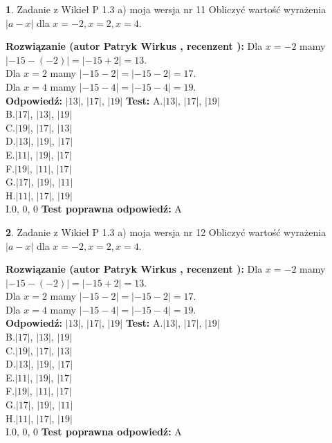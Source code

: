 \documentclass[12pt, a4paper]{article}
\theoremstyle{definition} %
\newtheorem{zad}{}
\newcommand{\zadStart}[1]{\begin{zad}#1\newline}
\newcommand{\zadStop}{\end{zad}}
\newcommand{\rozwStart}[2]{\noindent \textbf{Rozwiązanie (autor #1 , recenzent #2): }\newline}
\newcommand{\rozwStop}{\newline}
\newcommand{\odpStart}{\noindent \textbf{Odpowiedź:}\newline}
\newcommand{\odpStop}{\newline}
\newcommand{\testStart}{\noindent \textbf{Test:}\newline}
\newcommand{\testStop}{\newline}
\newcommand{\kluczStart}{\noindent \textbf{Test poprawna odpowiedź:}\newline}
\newcommand{\kluczStop}{\newline}
\begin{document}
\zadStart{Zadanie z Wikieł P 1.3 a) moja wersja nr 11}
Obliczyć wartość wyrażenia $|a - x|$ dla $x=-2,x=2,x=4$.
\zadStop
\rozwStart{Patryk Wirkus}{}
Dla $x = -2$ mamy $|-15 - (-2)| = |-15 + 2| = 13$.\\
Dla $x = 2$ mamy $|-15 - 2| = |-15 - 2| = 17$.\\
Dla $x = 4$ mamy $|-15 - 4| = |-15 - 4| = 19$.\\
\rozwStop
\odpStart
$|13|$, $|17|$, $|19|$
\odpStop
\testStart
A.$|13|$, $|17|$, $|19|$\\
B.$|17|$, $|13|$, $|19|$\\
C.$|19|$, $|17|$, $|13|$\\
D.$|13|$, $|19|$, $|17|$\\
E.$|11|$, $|19|$, $|17|$\\
F.$|19|$, $|11|$, $|17|$\\
G.$|17|$, $|19|$, $|11|$\\
H.$|11|$, $|17|$, $|19|$\\
I.$0$, $0$, $0$
\testStop
\kluczStart
A
\kluczStop



\zadStart{Zadanie z Wikieł P 1.3 a) moja wersja nr 12}
Obliczyć wartość wyrażenia $|a - x|$ dla $x=-2,x=2,x=4$.
\zadStop
\rozwStart{Patryk Wirkus}{}
Dla $x = -2$ mamy $|-15 - (-2)| = |-15 + 2| = 13$.\\
Dla $x = 2$ mamy $|-15 - 2| = |-15 - 2| = 17$.\\
Dla $x = 4$ mamy $|-15 - 4| = |-15 - 4| = 19$.\\
\rozwStop
\odpStart
$|13|$, $|17|$, $|19|$
\odpStop
\testStart
A.$|13|$, $|17|$, $|19|$\\
B.$|17|$, $|13|$, $|19|$\\
C.$|19|$, $|17|$, $|13|$\\
D.$|13|$, $|19|$, $|17|$\\
E.$|11|$, $|19|$, $|17|$\\
F.$|19|$, $|11|$, $|17|$\\
G.$|17|$, $|19|$, $|11|$\\
H.$|11|$, $|17|$, $|19|$\\
I.$0$, $0$, $0$
\testStop
\kluczStart
A
\kluczStop
\end{document}
